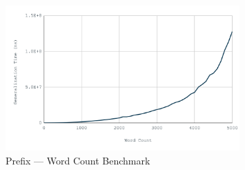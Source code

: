 \begin{figure}[H]
    \centering
    \includegraphics[width=0.8\textwidth]{images/prefix-word-count.png}
    \caption{Prefix --- Word Count Benchmark}\label{fig:prefix_word_count_bm}
\end{figure}